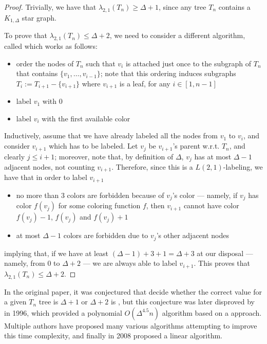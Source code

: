 \documentclass[a4paper, 12pt]{report}
\begin{document}
    \begin{proof}
        Trivially, we have that $\lambda_{2,1}(T_n) \ge \Delta + 1$, since any tree $T_n$ contains a $K_{1, \Delta}$ star graph.

        To prove that $\lambda_{2,1}(T_n) \le \Delta + 2$, we need to consider a different  algorithm, called  which works as follows:

        \begin{itemize}
            \item order the nodes of $T_n$ such that $v_i$ is attached just once to the subgraph of $T_n$ that contains $\{v_1, \ldots , v_{i -1 }\}$; note that this ordering induces subgraphs $T_i := T_{i + 1} - \{v_{ i +1}\}$ where $v_{i + 1}$ is a leaf, for any $i \in [1, n - 1]$
            \item label $v_1$ with 0
            \item label $v_i$ with the first available color
        \end{itemize}

        Inductively, assume that we have already labeled all the nodes from $v_1$ to $v_i$, and consider $v_{i + 1}$ which has to be labeled. Let $v_j$ be $v_{i + 1}$'s parent w.r.t. $T_n$, and clearly $j \le i + 1$; moreover, note that, by definition of $\Delta$, $v_j$ has at most $\Delta - 1$ adjacent nodes, not counting $v_{i + 1}$. Therefore, since this is a $L(2,1)$-labeling, we have that in order to label $v_{i + 1}$

        \begin{itemize}
            \item no more than 3 colors are forbidden because of $v_j$'s color --- namely, if $v_j$ has color $f(v_j)$ for some coloring function $f$, then $v_{i + 1}$ cannot have color $f(v_j) - 1$, $f(v_j)$ and $f(v_j) + 1$
            \item at most $\Delta - 1$ colors are forbidden due to $v_j$'s other adjacent nodes
        \end{itemize}
        
        implying that, if we have at least $(\Delta - 1) + 3 + 1 = \Delta + 3$ at our disposal --- namely, from 0 to $\Delta + 2$ --- we are always able to label $v_{i+1}$. This proves that $\lambda_{2,1}(T_n) \le \Delta + 2$.
    \end{proof}

    In the original paper, it was conjectured that decide whether the correct value for a given $T_n$ tree is $\Delta + 1$ or $\Delta + 2$ is \NPComplete, but this conjecture was later disproved by \textcite{chang} in 1996, which provided a polynomial $O(\Delta^{4.5} n)$ algorithm based on a  approach. Multiple authors have proposed many various algorithms attempting to improve this time complexity, and finally in 2008 \textcite{hasunuma} proposed a linear algorithm.
\end{document}
